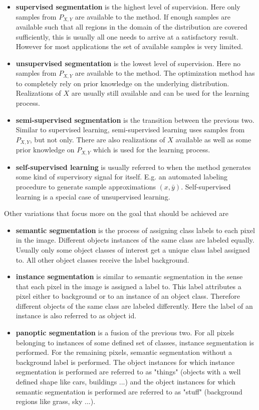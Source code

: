 \begin{itemize}
	\item \textbf{supervised segmentation} is the highest level of supervision. Here only samples from $P_{X, Y}$ are available to the method. If enough samples are available such that all regions in the domain of the distribution are covered sufficiently, this is usually all one needs to arrive at a satisfactory result. However for most applications the set of available samples is very limited.
	\item \textbf{unsupervised segmentation} is the lowest level of supervision. Here no samples from $P_{X, Y}$ are available to the method. The optimization method has to completely rely on prior knowledge on the underlying distribution. Realizations of $X$ are usually still available and can be used for the learning process.
	\item \textbf{semi-supervised segmentation} is the transition between the previous two. Similar to supervised learning, semi-supervised learning uses samples from $P_{X, Y}$, but not only. There are also realizations of $X$ available as well as some prior knowledge on $P_{X, Y}$ which is used for the learning process.
	\item \textbf{self-supervised learning} is usually referred to when the method generates some kind of supervisory signal for itself. E.g. an automated labeling procedure to generate sample approximations $(x, \bar{y})$. Self-supervised learning is a special case of unsupervised learning.
\end{itemize}

Other variations that focus more on the goal that should be achieved are

\begin{itemize}
	\item \textbf{semantic segmentation} is the process of assigning class labels to each pixel in the image. Different objects instances of the same class are labeled equally. Usually only some object classes of interest get a unique class label assigned to. All other object classes receive the label background.
	\item \textbf{instance segmentation} is similar to semantic segmentation in the sense that each pixel in the image is assigned a label to. This label attributes a pixel either to background or to an instance of an object class. Therefore different objects of the same class are labeled differently. Here the label of an instance is also referred to as object id.
	\item \textbf{panoptic segmentation} is a fusion of the previous two. For all pixels belonging to instances of some defined set of classes, instance segmentation is performed. For the remaining pixels, semantic segmentation without a background label is performed. The object instances for which instance segmentation is performed are referred to as "things" (objects with a well defined shape like cars, buildings ...) and the object instances for which semantic segmentation is performed are referred to as "stuff" (background regions like grass, sky ...).
\end{itemize}
